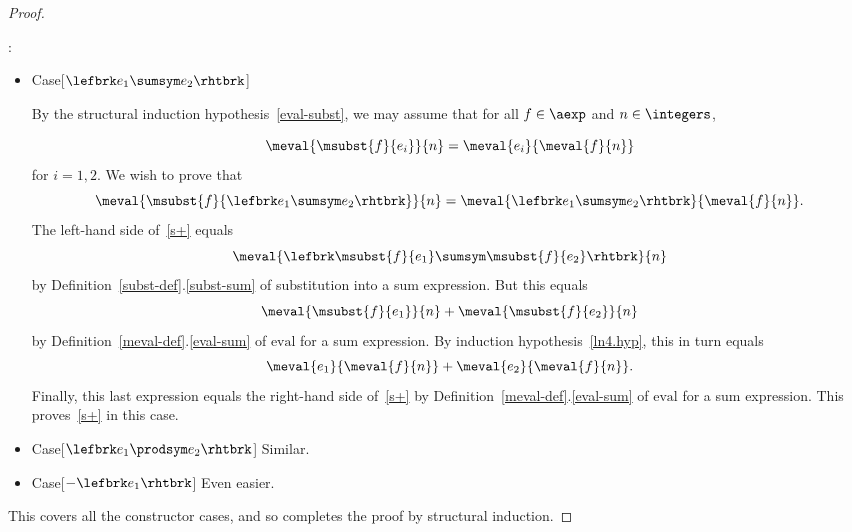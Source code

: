 \begin{definition}
\begin{proof}
\begin{itemize}
\end{itemize}

:
\begin{itemize}

\item Case[$\lefbrk e_1 \sumsym e_2 \rhtbrk$]

  By the structural induction hypothesis~\eqref{eval-subst}, we may assume
  that for all $f \in \aexp$ and $n \in \integers$,

\begin{equation}\label{ln4.hyp}
\meval{\msubst{f}{e_i}}{n}  =  \meval{e_i}{\meval{f}{n}}
\end{equation}
for $i= 1,2$.  We wish to prove that
\begin{equation}\label{s+}
\meval{\msubst{f}{\lefbrk e_1\sumsym e_2 \rhtbrk}}{n} = \meval{\lefbrk
  e_1 \sumsym e_2 \rhtbrk}{ \meval{f}{n}}.
\end{equation}
The left-hand side of~\eqref{s+} equals
\[
\meval{\lefbrk \msubst{f}{e_1} \sumsym \msubst{f}{e_2} \rhtbrk}{ n}
\]
by Definition~\ref{subst-def}.\ref{subst-sum} of substitution into a sum
expression.  But this equals
\[
\meval{\msubst{f}{e_1}}{n} + \meval{\msubst{f}{e_2}}{n}
\]
by Definition~\ref{meval-def}.\eqref{eval-sum} of $\text{eval}$ for a sum expression.  By
induction hypothesis~\eqref{ln4.hyp}, this in turn equals
\[
\meval{e_1}{\meval{f}{n}} + \meval{e_2}{\meval{f}{n}}.
\]
Finally, this last expression equals the right-hand side of~\eqref{s+} by
Definition~\ref{meval-def}.\eqref{eval-sum} of $\text{eval}$ for a sum
expression.  This proves~\eqref{s+} in this case.

\item Case[$\lefbrk e_1 \prodsym e_2 \rhtbrk$]  Similar.

\item Case[$-\lefbrk e_1 \rhtbrk$]  Even easier.

\end{itemize}

This covers all the constructor cases, and so completes the proof by
structural induction.

\end{proof}

\begin{problems}
\practiceproblems
{}

\classproblems
{}

\examproblems
{}


\end{problems}
\end{definition}
